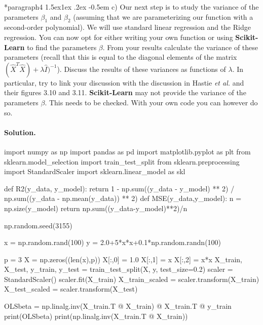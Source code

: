 \documentclass[%
oneside,                 %
final,                   %
10pt]{article}
\makeatletter
\newenvironment{doconceexercise}{}{}
\newcommand\subex{\@startsection*{paragraph}{4}{\z@}%
                  {1.5ex\@plus1ex \@minus.2ex}%
                  {-0.5em}%
                  {\normalfont\normalsize\bfseries}}
\makeatother
\begin{document}
\begin{doconceexercise}
\subex{c)}
Our next step is to study the variance of the parameters $\beta_1$ and $\beta_2$ (assuming that we are parameterizing our function with a second-order polynomial). We will use standard linear regression and the Ridge regression.  You can now opt for either writing your own function or using \textbf{Scikit-Learn} to find the parameters $\beta$. From your results calculate the variance of these parameters (recall that this is equal to the diagonal elements of the matrix $(\hat{X}^T\hat{X})+\lambda\hat{I})^{-1}$). Discuss the results of these variances as functions of $\lambda$. In particular, try to link your discussion with the discussion in Hastie \emph{et al.} and their figures 3.10 and  3.11. \textbf{Scikit-Learn} may not provide the variance of the parameters $\beta$. This needs to be checked. With your own code you can however do so.

\paragraph{Solution.}
import numpy as np
import pandas as pd
import matplotlib.pyplot as plt
from sklearn.model_selection import train_test_split
from sklearn.preprocessing import StandardScaler
import sklearn.linear_model as skl

def R2(y_data, y_model):
    return 1 - np.sum((y_data - y_model) ** 2) / np.sum((y_data - np.mean(y_data)) ** 2)
def MSE(y_data,y_model):
    n = np.size(y_model)
    return np.sum((y_data-y_model)**2)/n

np.random.seed(3155)

x = np.random.rand(100)
y = 2.0+5*x*x+0.1*np.random.randn(100)

p = 3
X = np.zeros((len(x),p))
X[:,0] = 1.0
X[:,1] = x
X[:,2] = x*x
X_train, X_test, y_train, y_test = train_test_split(X, y, test_size=0.2)
scaler = StandardScaler()
scaler.fit(X_train)
X_train_scaled = scaler.transform(X_train)
X_test_scaled = scaler.transform(X_test)

OLSbeta = np.linalg.inv(X_train.T @ X_train) @ X_train.T @ y_train
print(OLSbeta)
print(np.linalg.inv(X_train.T @ X_train))


\end{doconceexercise}
\end{document}
